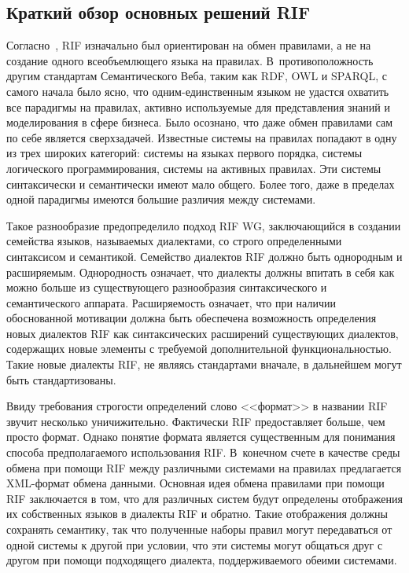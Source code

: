 \begin{multicols}{2}
\section{Краткий обзор основных решений RIF}

Согласно~\cite{7kal}, RIF изначально был ориентирован на обмен правилами, а не на 
создание одного всеобъемлющего языка на правилах. В~противоположность другим 
стандартам Семантического Веба, таким как RDF, OWL и SPARQL, с самого начала было ясно, 
что од\-ним-един\-ст\-вен\-ным языком не удастся охватить все парадигмы на правилах, активно 
используемые для представления знаний и моделирования в сфере бизнеса. Было осознано, 
что даже обмен правилами сам по себе является сверхзадачей. Известные системы на 
правилах попадают в одну из трех широких категорий: системы на языках первого порядка, 
системы логического программирования, системы на активных правилах. Эти сис\-те\-мы 
синтаксически и семантически имеют мало общего. Более того, даже в пределах одной 
парадигмы имеются большие различия между системами. 

Такое разнообразие предопределило подход RIF WG, заключающийся в создании семейства 
языков, называемых диалектами, со строго определенными синтаксисом и семантикой. 
Семейство диалектов RIF должно быть однородным и расширяемым. Однородность 
означает, что диалекты должны впитать в себя как можно больше из существующего 
разнообразия синтаксического и семантического аппарата. Расширяемость означает, что 
при наличии обоснованной мотивации должна быть обеспечена возможность определения 
новых диалектов RIF как синтаксических расширений существующих диалектов, 
содержащих новые элементы с требуемой дополнительной функциональностью. Такие 
новые диалекты RIF, не являясь стандартами вначале, в дальнейшем могут быть 
стандартизованы.

Ввиду требования строгости определений слово <<формат>> в названии RIF звучит 
несколько уничижительно. Фактически RIF предоставляет больше, чем просто формат. 
Однако понятие формата является существенным для понимания способа предполагаемого 
использования RIF. В~конечном счете в качестве среды обмена при помощи RIF между 
различными системами на правилах предлагается XML-формат обмена данными. Основная 
идея обмена правилами при помощи RIF заключается в том, что для различных систем будут 
определены отображения их собственных языков в диалекты RIF и обратно. Такие 
отображения должны сохранять семантику, так что полученные наборы правил могут 
передаваться от одной системы к другой при условии, что эти системы могут общаться друг 
с другом при помощи подходящего диалекта, поддерживаемого обеими системами.


\end{multicols}
